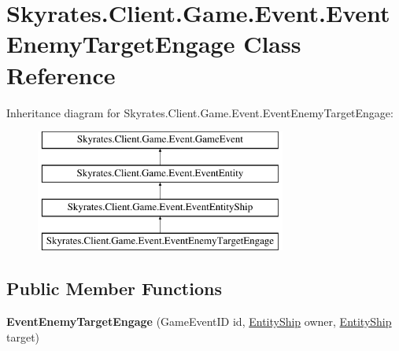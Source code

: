 \hypertarget{class_skyrates_1_1_client_1_1_game_1_1_event_1_1_event_enemy_target_engage}{\section{Skyrates.\-Client.\-Game.\-Event.\-Event\-Enemy\-Target\-Engage Class Reference}
\label{class_skyrates_1_1_client_1_1_game_1_1_event_1_1_event_enemy_target_engage}
}
Inheritance diagram for Skyrates.\-Client.\-Game.\-Event.\-Event\-Enemy\-Target\-Engage\-:\begin{figure}[H]
\begin{center}
\leavevmode
\includegraphics[height=4.000000cm]{class_skyrates_1_1_client_1_1_game_1_1_event_1_1_event_enemy_target_engage}
\end{center}
\end{figure}
\subsection*{Public Member Functions}
\begin{DoxyCompactItemize}
\item 
\hypertarget{class_skyrates_1_1_client_1_1_game_1_1_event_1_1_event_enemy_target_engage_a0dda4e7bbea880d425a72a855a95f3e1}{{\bfseries Event\-Enemy\-Target\-Engage} (Game\-Event\-I\-D id, \hyperlink{class_skyrates_1_1_client_1_1_entity_1_1_entity_ship}{Entity\-Ship} owner, \hyperlink{class_skyrates_1_1_client_1_1_entity_1_1_entity_ship}{Entity\-Ship} target)}\label{class_skyrates_1_1_client_1_1_game_1_1_event_1_1_event_enemy_target_engage_a0dda4e7bbea880d425a72a855a95f3e1}

\end{DoxyCompactItemize}
